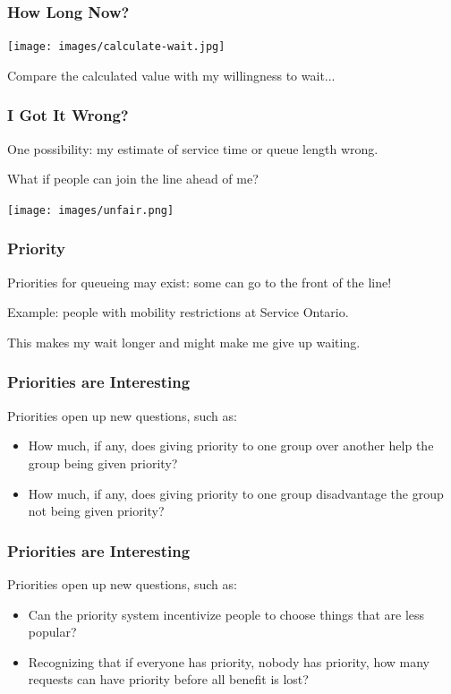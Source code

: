 \begin{frame}
\frametitle{How Long Now?}

\begin{center}
	\texttt{[image: images/calculate-wait.jpg]}
\end{center}

Compare the calculated value with my willingness to wait...

\end{frame}

\begin{frame}
\frametitle{I Got It Wrong?}

One possibility: my estimate of service time or queue length wrong.

What if people can join the line ahead of me?

\begin{center}
	\texttt{[image: images/unfair.png]}
\end{center}


\end{frame}


\begin{frame}
\frametitle{Priority}

Priorities for queueing may exist: some can go to the front of the line!

Example: people with mobility restrictions at Service Ontario.

This makes my wait longer and might make me give up waiting.

\end{frame}


\begin{frame}
\frametitle{Priorities are Interesting}

Priorities open up new questions, such as:

\begin{itemize}
	\item How much, if any, does giving priority to one group over another help the group being given priority? \vspace{3em}
	\item How much, if any, does giving priority to one group disadvantage the group not being given priority?
\end{itemize}

\end{frame}


\begin{frame}
\frametitle{Priorities are Interesting}

Priorities open up new questions, such as:

\begin{itemize}
	\item Can the priority system incentivize people to choose things that are less popular? \vspace{3em}
	\item Recognizing that if everyone has priority, nobody has priority, how many requests can have priority before all benefit is lost?
\end{itemize}

\end{frame}


